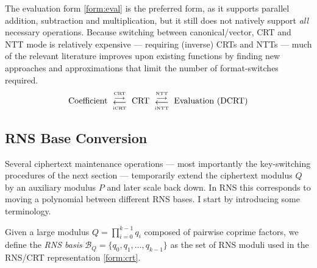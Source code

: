 The evaluation form \eqref{form:eval} is the preferred form, as it supports parallel addition, subtraction and multiplication, but it still does not natively support \textit{all} necessary operations. Because switching between canonical/vector, CRT and NTT mode is relatively expensive --- requiring (inverse) CRTs and NTTs --- much of the relevant literature \cite{cryptoeprint:2012/099, cryptoeprint:2016/510, cryptoeprint:2018/117, cryptoeprint:2021/204} improves upon existing functions by finding new approaches and approximations that limit the number of format-switches required. 
\begin{equation*}
    \raisebox{0.3ex}{\text{ Coefficient }}
    \overset{\text{\tiny CRT}}{\underset{\text{\tiny iCRT}}{\overset{\longrightarrow}{\longleftarrow}}}
    \raisebox{0.3ex}{\text{ CRT }}
    \overset{\text{\tiny NTT}}{\underset{\text{\tiny iNTT}}{\overset{\longrightarrow}{\longleftarrow}}}
    \raisebox{0.3ex}{\text{ Evaluation (DCRT) }}
\end{equation*}





\subsection{RNS Base Conversion}
\label{sec:rns-base-conversion}
Several ciphertext maintenance operations --- most importantly the key-switching procedures of the next section --- temporarily extend the ciphertext modulus $Q$ by an auxiliary modulus $P$ and later scale back down. In RNS this corresponds to moving a polynomial between different RNS bases. I start by introducing some terminology.

\begin{definition} 
    Given a large modulus $Q = \prod_{i=0}^{k-1} q_i$ composed of pairwise coprime factors, we define the \textit{RNS basis} $\mathcal{B}_Q = \{q_0, q_1, \dots, q_{k-1}\}$ as the set of RNS moduli used in the RNS/CRT representation \eqref{form:crt}.
\end{definition}

